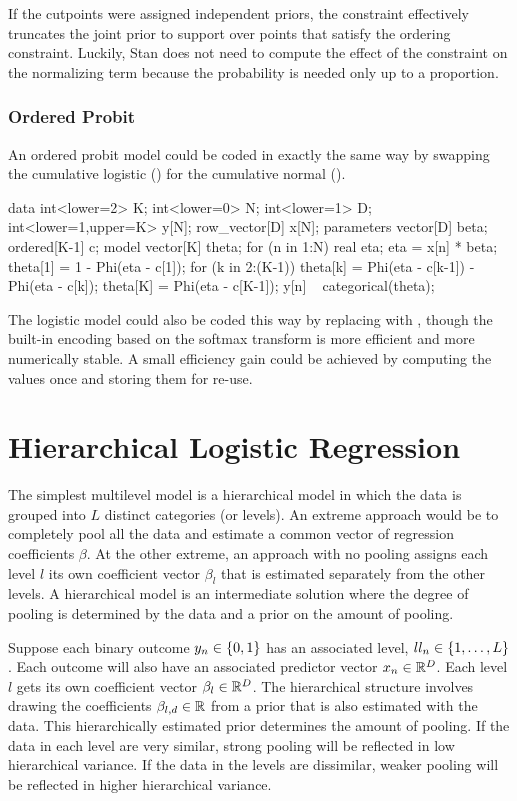 If the cutpoints were assigned independent priors, the constraint
effectively truncates the joint prior to support over points that
satisfy the ordering constraint.  Luckily, Stan does not need to
compute the effect of the constraint on the normalizing term because
the probability is needed only up to a proportion.


\subsubsection{Ordered Probit}

An ordered probit model could be coded in exactly the same way by
swapping the cumulative logistic () for the cumulative
normal ().
%

\begin{stancode}
data {
  int<lower=2> K;
  int<lower=0> N;
  int<lower=1> D;
  int<lower=1,upper=K> y[N];
  row_vector[D] x[N];
}
parameters {
  vector[D] beta;
  ordered[K-1] c;
}
model {
  vector[K] theta;
  for (n in 1:N) {
    real eta;
    eta = x[n] * beta;
    theta[1] = 1 - Phi(eta - c[1]);
    for (k in 2:(K-1))
      theta[k] = Phi(eta - c[k-1]) - Phi(eta - c[k]);
    theta[K] = Phi(eta - c[K-1]);
    y[n] ~ categorical(theta);
  }
}
\end{stancode}
%
The logistic model could also be coded this way by replacing
 with , though the built-in encoding based
on the softmax transform is more efficient and more numerically
stable.  A small efficiency gain could be achieved by computing the
values  once and storing them for re-use.


\section{Hierarchical Logistic Regression}

The simplest multilevel model is a hierarchical model in which the
data is grouped into $L$ distinct categories (or levels).  An extreme
approach would be to completely pool all the data and estimate a
common vector of regression coefficients $\beta$.  At the other
extreme, an approach with no pooling assigns each level $l$ its own
coefficient vector $\beta_l$ that is estimated separately from the
other levels.  A hierarchical model is an intermediate solution where
the degree of pooling is determined by the data and a prior on the
amount of pooling.

Suppose each binary outcome $y_n \in \{ 0,1 \}$ has an associated
level, $ll_n \in \{ 1,\ldots,L \}$.  Each outcome will also have
an associated predictor vector $x_n \in \mathbb{R}^D$.  Each level $l$
gets its own coefficient vector $\beta_l \in \mathbb{R}^D$.  The
hierarchical structure involves drawing the coefficients $\beta_{l,d}
\in \mathbb{R}$ from a prior that is also estimated with the data.  This
hierarchically estimated prior determines the amount of pooling.  If
the data in each level are very similar, strong pooling will be
reflected in low hierarchical variance.  If the data in the levels are
dissimilar, weaker pooling will be reflected in higher hierarchical variance.

